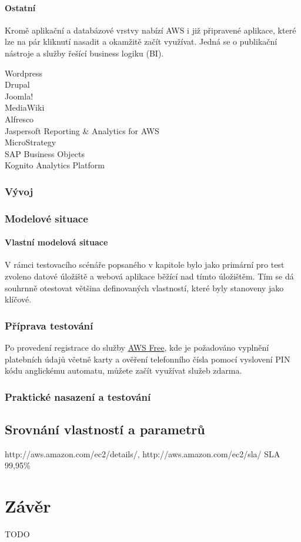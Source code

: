 \paragraph{Ostatní}
Kromě aplikační a databázové vrstvy nabízí AWS i již připravené aplikace, které lze na pár kliknutí nasadit a okamžitě začít využívat. Jedná se o publikační nástroje a služby řešící business logiku (BI).
\begin{description}
	\item [Wordpress]
	\item [Drupal]
	\item [Joomla!]
	\item [MediaWiki]
	\item [Alfresco]
	\item [Jaspersoft Reporting \& Analytics for AWS]
	\item [MicroStrategy]
	\item [SAP Business Objects]
	\item [Kognito Analytics Platform]
\end{description}

\subsubsection{Vývoj}

\subsubsection{Modelové situace}

\paragraph{Vlastní modelová situace}
V rámci testovacího scénáře popsaného v kapitole  bylo jako primární pro test zvoleno datové úložiště a webová aplikace běžící nad tímto úložištěm. Tím se dá souhrnně otestovat většina definovaných vlastností, které byly stanoveny jako klíčové.

\subsubsection{Příprava testování}
Po provedení registrace do služby \href{https://aws.amazon.com/free/}{AWS Free}, kde je požadováno vyplnění platebních údajů včetně karty a ověření telefonního čísla pomocí vyslovení PIN kódu anglickému automatu, můžete začít využívat služeb zdarma.

\subsubsection{Praktické nasazení a testování}

\subsection{Srovnání vlastností a parametrů}
http://aws.amazon.com/ec2/details/, http://aws.amazon.com/ec2/sla/ SLA 99,95\%

\newpage
\section{Závěr}
TODO